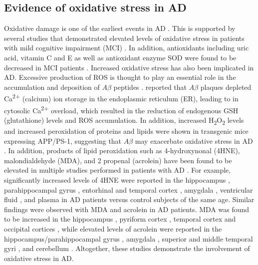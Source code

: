 \subsection{Evidence of oxidative stress in AD}
Oxidative damage is one of the earliest events in AD \citep{Nunomura2001}. This is supported by several studies that demonstrated elevated levels of oxidative stress in patients with mild cognitive impairment (MCI) \citep{Ansari2010,Pratico2004,Williams2006}. In addition, antioxidants including uric acid, vitamin C and E as well as antioxidant enzyme SOD were found to be decreased in MCI patients \citep{Rinaldi2003,Torres2011}. Increased oxidative stress has also been implicated in AD. Excessive production of ROS is thought to play an essential role in the accumulation and deposition of $A\beta$ peptides \citep{Bonda2010}. \citet{Ferreiro2008} reported that $A\beta$ plaques depleted Ca\textsuperscript{2+}  (calcium) ion storage in the endoplasmic reticulum (ER), leading to in cytosolic Ca\textsuperscript{2+} overload, which resulted in the reduction of endogenous GSH (glutathione) levels and ROS accumulation. In addition, increased H\textsubscript{2}O\textsubscript{2} levels and increased peroxidation of proteins and lipids were shown in transgenic mice expressing APP/PS-1, suggesting that $A\beta$ may exacerbate oxidative stress in AD \citep{Matsuoka2001,Zhao2013}. In addition, products of lipid peroxidation such as 4-hydroxynonal (4HNE), malondialdehyde (MDA), and 2 propenal (acrolein) have been found to be elevated in multiple studies performed in patients with AD \citep{Wang2014,Zhao2013}. For example, significantly increased levels of 4HNE were reported in the hippocampus \citep{Lovell1995,Markesbery1998,Montine1998}, parahippocampal gyrus \citep{Markesbery1998}, entorhinal and temporal cortex \citep{Montine1998}, amygdala \citep{Lovell1995,Markesbery1998}, ventricular fluid \citep{Lovell1997}, and plasma \citep{McGrath2001} in AD patients versus control subjects of the same age. Similar findings were observed with MDA and acrolein in AD patients. MDA was found to be increased in the hippocampus \citep{Lovell1995}, pyriform cortex \citep{Lovell1995}, temporal cortex \citep{Marcus1998,Palmer1994} and occipital cortices \citep{Miranda2000}, while elevated levels of acrolein were reported in the hippocampus/parahippocampal gyrus \citep{Bradley2010,Calingasan1999,Lovell2001,Williams2006}, amygdala \citep{Lovell2001}, superior and middle temporal gyri \citep{Bradley2010,Williams2006}, and cerebellum \citep{Bradley2010,Williams2006}. Altogether, these studies demonstrate the involvement of oxidative stress in AD.

